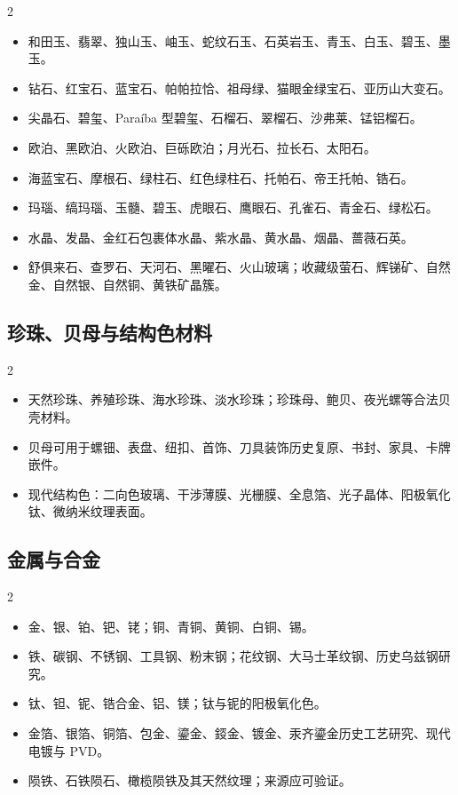\documentclass[lang=en,a4paper,11pt]{elegantpaper}
\begin{document}
\begin{multicols}{2}
\begin{itemize}
\item 和田玉、翡翠、独山玉、岫玉、蛇纹石玉、石英岩玉、青玉、白玉、碧玉、墨玉。
\item 钻石、红宝石、蓝宝石、帕帕拉恰、祖母绿、猫眼金绿宝石、亚历山大变石。
\item 尖晶石、碧玺、Paraíba 型碧玺、石榴石、翠榴石、沙弗莱、锰铝榴石。
\item 欧泊、黑欧泊、火欧泊、巨砾欧泊；月光石、拉长石、太阳石。
\item 海蓝宝石、摩根石、绿柱石、红色绿柱石、托帕石、帝王托帕、锆石。
\item 玛瑙、缟玛瑙、玉髓、碧玉、虎眼石、鹰眼石、孔雀石、青金石、绿松石。
\item 水晶、发晶、金红石包裹体水晶、紫水晶、黄水晶、烟晶、蔷薇石英。
\item 舒俱来石、查罗石、天河石、黑曜石、火山玻璃；收藏级萤石、辉锑矿、自然金、自然银、自然铜、黄铁矿晶簇。
\end{itemize}
\end{multicols}

\subsection{珍珠、贝母与结构色材料}


\begin{multicols}{2}
\begin{itemize}
\item 天然珍珠、养殖珍珠、海水珍珠、淡水珍珠；珍珠母、鲍贝、夜光螺等合法贝壳材料。
\item 贝母可用于螺钿、表盘、纽扣、首饰、刀具装饰历史复原、书封、家具、卡牌嵌件。
\item 现代结构色：二向色玻璃、干涉薄膜、光栅膜、全息箔、光子晶体、阳极氧化钛、微纳米纹理表面。
\end{itemize}
\end{multicols}

\subsection{金属与合金}


\begin{multicols}{2}
\begin{itemize}
\item 金、银、铂、钯、铑；铜、青铜、黄铜、白铜、锡。
\item 铁、碳钢、不锈钢、工具钢、粉末钢；花纹钢、大马士革纹钢、历史乌兹钢研究。
\item 钛、钽、铌、锆合金、铝、镁；钛与铌的阳极氧化色。
\item 金箔、银箔、铜箔、包金、鎏金、鋄金、镀金、汞齐鎏金历史工艺研究、现代电镀与 PVD。
\item 陨铁、石铁陨石、橄榄陨铁及其天然纹理；来源应可验证。
\end{itemize}
\end{multicols}
\end{document}
